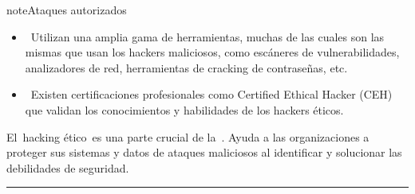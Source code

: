 \documentclass[letterpaper,10pt,spanish]{sphinxmanual}
\begin{document}
\begin{sphinxadmonition}{note}{Ataques autorizados}
\begin{itemize}
\begin{itemize}
\end{itemize}

\item {} 
\sphinxAtStartPar
{} Utilizan una amplia gama de herramientas, muchas de las cuales son las mismas que usan los hackers maliciosos, como escáneres de vulnerabilidades, analizadores de red, herramientas de cracking de contraseñas, etc.

\item {} 
\sphinxAtStartPar
{} Existen certificaciones profesionales como Certified Ethical Hacker (CEH) que validan los conocimientos y habilidades de los hackers éticos.

\end{itemize}

\sphinxAtStartPar
El hacking ético es una parte crucial de la . Ayuda a las organizaciones a proteger sus sistemas y datos de ataques maliciosos al identificar y solucionar las debilidades de seguridad.
\end{sphinxadmonition}


\bigskip\hrule\bigskip
\end{document}
